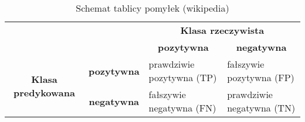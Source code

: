 \begin{table}[h]
	\centering
	
	\begin{threeparttable}
		\caption{Schemat tablicy pomyłek (wikipedia)}
		\label{tab:tab2}
				
		\begin{tabularx}{1\textwidth}{ |c|c|X|X| }\hline
		  \multicolumn{2}{|c|}{\multirow{2}{*}{}} & \multicolumn{2}{|c|}{\textbf{Klasa rzeczywista}}\\ \cline{3-4}
      
		  \multicolumn{2}{|c|}{} & \multicolumn{1}{|c|}{\textbf{pozytywna}} & \multicolumn{1}{c|}{\textbf{negatywna}}\\ \hline
       
		  \multirow{2}{*}{\textbf{Klasa predykowana}} & \textbf{pozytywna} & prawdziwie pozytywna (TP) & fałszywie pozytywna (FP)\\ \cline{2-4}
      
		   & \textbf{negatywna} & fałszywie negatywna (FN) & prawdziwie negatywna (TN)\\ \hline
		\end{tabularx}

	\end{threeparttable}
\end{table}
























